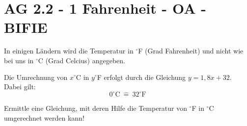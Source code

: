 \section{AG 2.2 - 1 Fahrenheit - OA - BIFIE}

\begin{beispiel}[AG 2.2]{1} %
		In einigen Ländern wird die Temperatur in $^\circ$F (Grad Fahrenheit) und nicht wie bei uns in $^\circ$C (Grad Celcius) angegeben. 

Die Umrechnung von $x^\circ$C in $y^\circ$F erfolgt durch die Gleichung $y=1,8x+32$. Dabei gilt:
\[0^\circ\text{C} ~\widehat{=}~	 32^\circ\text{F}\]

Ermittle eine Gleichung, mit deren Hilfe die Temperatur von $^\circ$F in $^\circ$C umgerechnet werden kann!

\end{beispiel}